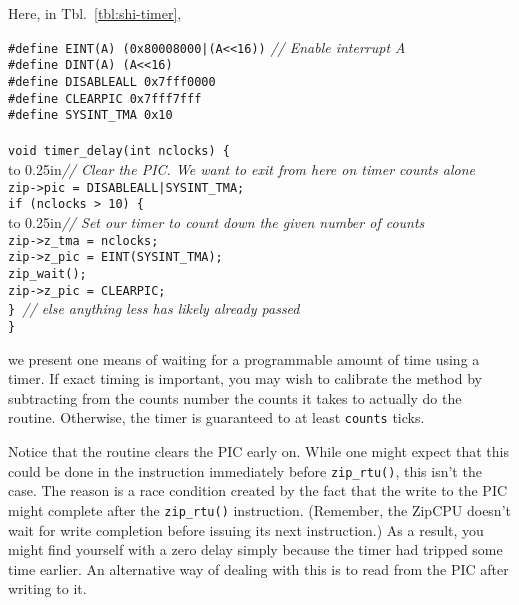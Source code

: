 \documentclass{gqtekspec}
\begin{document}
Here, in Tbl.~\ref{tbl:shi-timer},
\begin{table}\begin{center}
\begin{tabbing}
{\tt \#define EINT(A) (0x80008000|(A<<16))} \= {\em // Enable interrupt A}\\
{\tt \#define DINT(A) (A<<16)} \\
{\tt \#define DISABLEALL 0x7fff0000} \\
{\tt \#define CLEARPIC 0x7fff7fff} \\
{\tt \#define SYSINT\_TMA 0x10} \\
\\
{\tt void timer\_delay(int nclocks) \{} \\
\hbox to 0.25in{}\= {\em // Clear the PIC.  We want to exit from here on timer counts alone}\\
	\> {\tt zip->pic = DISABLEALL|SYSINT\_TMA;}\\
	\> {\tt if (nclocks > 10) \{}\\
	\> \hbox to 0.25in{}\= {\em // Set our timer to count down the given number of counts}\\
	\> \> {\tt zip->z\_tma = nclocks;} \\
	\> \> {\tt zip->z\_pic = EINT(SYSINT\_TMA);} \\
	\> \> {\tt zip\_wait();} \\
	\> \> {\tt zip->z\_pic = CLEARPIC;} \\
	\> {\tt \} }{\em // else anything less has likely already passed} \\
{\tt \}}\\
\end{tabbing}
\caption{Waiting on a timer}\label{tbl:shi-timer}
\end{center}\end{table}
we present one means of waiting for a programmable amount of time using a
timer.  If exact timing is important, you may wish to calibrate the method
by subtracting from the counts number the counts it takes to actually do the
routine.  Otherwise, the timer is guaranteed to at least {\tt counts}
ticks.

Notice that the routine clears the PIC early on.  While one might expect
that this could be done in the instruction immediately before {\tt zip\_rtu()},
this isn't the case.  The reason is a race condition created by the fact that
the write to the PIC might complete after the {\tt zip\_rtu()} instruction.
(Remember, the ZipCPU doesn't wait for write completion before issuing its
next instruction.)  As a result, you might find yourself with a zero delay
simply because the timer had tripped some time earlier.  An alternative way
of dealing with this is to read from the PIC after writing to it.
\end{document}
